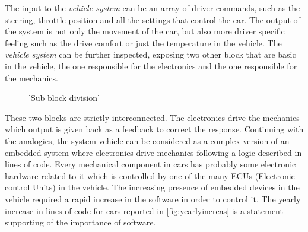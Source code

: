 \documentclass[../main.tex]{subfiles}
\begin{document}
The input to the \textit{vehicle system} can be an array of driver commands, such as the steering, throttle position and all the settings that control the car. The output of the system is not only the movement of the car, but also more driver specific feeling such as the drive comfort or just the temperature in the vehicle. The \textit{vehicle system} can be further inspected, exposing two other block that are basic in the vehicle, the one responsible for the electronics and the one responsible for the mechanics. 
     \begin{figure}[ht]
        \begin{center}
        \end{center}
        \caption{'Sub block division'}
    \end{figure}       
These two blocks are strictly interconnected. The electronics drive the mechanics which output is given back as a feedback to correct the response. Continuing with the analogies, the system vehicle can be considered as a complex version of an embedded system where electronics drive mechanics following a logic described in lines of code.
Every mechanical component in cars has probably some electronic hardware related to it which is controlled by one of the many ECUs (Electronic control Units) in the vehicle. The increasing presence of embedded devices in the vehicle required a rapid increase in the software in order to control it. The yearly increase in lines of code for cars reported in \ref{fig:yearlyincreas} is a statement supporting of the importance of software. 
\end{document}
